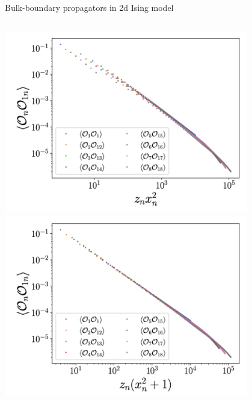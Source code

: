 \documentclass{fdubeamer}
\newcommand{\1}{\mathbb{1}}
\begin{document}
\begin{frame}{Bulk-boundary propagators in 2d Ising model}
\begin{columns}[T]
    \centering
    \includegraphics[width=0.8\textwidth]{images/holographic/bulk-boundary-propagator-1.png}
    \includegraphics[width=0.8\textwidth]{images/holographic/bulk-boundary-propagator-2.png}
    \vspace{-0.5em}

\end{columns}


\end{frame}
\end{document}
